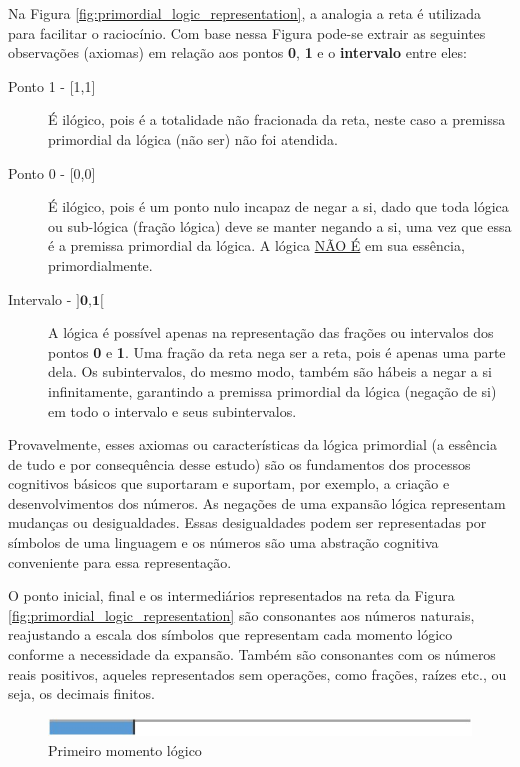 Na Figura \ref{fig:primordial_logic_representation}, a analogia a reta é utilizada para facilitar o raciocínio. Com base nessa Figura pode-se extrair as seguintes observações (axiomas) em relação aos pontos \textbf{0}, \textbf{1} e o \textbf{intervalo} entre eles:
	\begin{description}
	   \item[Ponto 1 - {[1,1]}] É ilógico, pois é a totalidade não fracionada da reta, neste caso a premissa primordial da lógica (não ser) não foi atendida.
	   \item[Ponto 0 - {[0,0]}] É ilógico, pois é um ponto nulo incapaz de negar a si, dado que toda lógica ou sub-lógica (fração lógica) deve se manter negando a si, uma vez que essa é a premissa primordial da lógica. A lógica \underline{NÃO É} em sua essência, primordialmente.
	   \item[Intervalo - $\textbf{{]0,1[}}$] A lógica é possível apenas na representação das frações ou intervalos dos pontos \textbf{0} e \textbf{1}. Uma fração da reta nega ser a reta, pois é apenas uma parte dela. Os subintervalos, do mesmo modo, também são hábeis a negar a si infinitamente, garantindo a premissa primordial da lógica (negação de si) em todo o intervalo e seus subintervalos. 
	\end{description}

Provavelmente, esses axiomas ou características da lógica primordial (a essência de tudo e por consequência desse estudo) são os fundamentos dos processos cognitivos básicos que suportaram e suportam, por exemplo, a criação e desenvolvimentos dos números. As negações de uma expansão lógica representam mudanças ou desigualdades. Essas desigualdades podem ser representadas por símbolos de uma linguagem e os números são uma abstração cognitiva conveniente para essa representação.

O ponto inicial, final e os intermediários representados na reta da Figura \ref{fig:primordial_logic_representation} são consonantes aos números naturais, reajustando a escala dos símbolos que representam cada momento lógico conforme a necessidade da expansão. Também são consonantes com os números reais positivos, aqueles representados sem operações, como frações, raízes etc., ou seja, os decimais finitos.
	\begin{figure}[H]
	\caption{Primeiro momento lógico}
	\label{fig:first_logical_moment}
	\centering
	\includegraphics[scale=.87]{sections/images/first_logical_moment.jpg}
	\end{figure}

